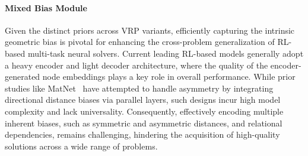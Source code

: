 \documentclass{article}
\theoremstyle{plain}
\theoremstyle{definition}
\theoremstyle{remark}
\begin{document}
\paragraph{Mixed Bias Module}
Given the distinct priors across VRP variants, efficiently capturing the intrinsic geometric bias is pivotal for enhancing the cross-problem generalization of RL-based multi-task neural solvers. Current leading RL-based models generally adopt a heavy encoder and light decoder architecture, where the quality of the encoder-generated node embeddings plays a key role in overall performance. While prior studies like MatNet~\citep{kwon2021matnet} have attempted to handle asymmetry by integrating directional distance biases via parallel layers, such designs incur high model complexity and lack universality. Consequently, effectively encoding multiple inherent biases, such as symmetric and asymmetric distances, and relational dependencies, remains challenging, hindering the acquisition of high-quality solutions across a wide range of problems. 
\end{document}

